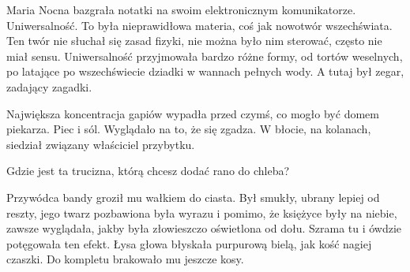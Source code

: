 Maria Nocna bazgrała notatki na swoim elektronicznym komunikatorze.
Uniwersalność. 
To była nieprawidłowa materia, coś jak nowotwór wszechświata.
Ten twór nie słuchał się zasad fizyki, nie można było nim sterować, często nie miał sensu.
Uniwersalność przyjmowała bardzo różne formy, od tortów weselnych, po latające po wszechświecie dziadki w wannach pełnych wody.
A tutaj był zegar, zadający zagadki.

Największa koncentracja gapiów wypadła przed czymś, co mogło być domem piekarza.
Piec i sól. Wyglądało na to, że się zgadza.
W błocie, na kolanach, siedział związany właściciel przybytku.
\begin{dialogue}
	\ds{} Gdzie jest ta trucizna, którą chcesz dodać rano do chleba?
\end{dialogue}

Przywódca bandy groził mu wałkiem do ciasta. 
Był smukły, ubrany lepiej od reszty, jego twarz pozbawiona była wyrazu i pomimo, że księżyce były na niebie,
zawsze wyglądała, jakby była złowieszczo oświetlona od dołu.
Szrama tu i ówdzie potęgowała ten efekt.
Łysa głowa błyskała purpurową bielą, jak kość nagiej czaszki.
Do kompletu brakowało mu jeszcze kosy.
	

